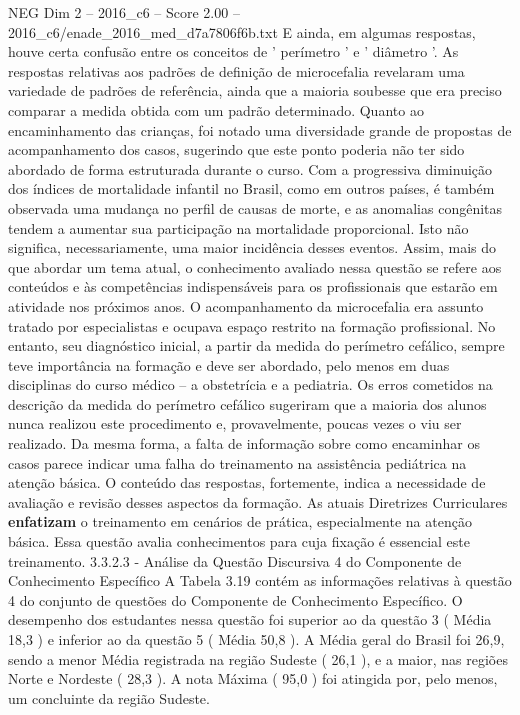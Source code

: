 \begin{textsample}{NEG Dim 2 – 2016\_c6 – Score 2.00 – 2016\_c6/enade\_2016\_med\_d7a7806f6b.txt}
E ainda, em algumas respostas, houve certa confusão entre os conceitos de ' perímetro ' e ' diâmetro '.
As respostas relativas aos padrões de definição de microcefalia revelaram uma variedade de padrões de referência, ainda que a maioria soubesse que era preciso comparar a medida obtida com um padrão determinado.
Quanto ao encaminhamento das crianças, foi notado uma diversidade grande de propostas de acompanhamento dos casos, sugerindo que este ponto poderia não ter sido abordado de forma estruturada durante o curso.
Com a progressiva diminuição dos índices de mortalidade infantil no Brasil, como em outros países, é também observada uma mudança no perfil de causas de morte, e as anomalias congênitas tendem a aumentar sua participação na mortalidade proporcional.
Isto não significa, necessariamente, uma maior incidência desses eventos.
Assim, mais do que abordar um tema atual, o conhecimento avaliado nessa questão se refere aos conteúdos e às competências indispensáveis para os profissionais que estarão em atividade nos próximos anos.
O acompanhamento da microcefalia era assunto tratado por especialistas e ocupava espaço restrito na formação profissional.
No entanto, seu diagnóstico inicial, a partir da medida do perímetro cefálico, sempre teve importância na formação e deve ser abordado, pelo menos em duas disciplinas do curso médico – a obstetrícia e a pediatria.
Os erros cometidos na descrição da medida do perímetro cefálico sugeriram que a maioria dos alunos nunca realizou este procedimento e, provavelmente, poucas vezes o viu ser realizado.
Da mesma forma, a falta de informação sobre como encaminhar os casos parece indicar uma falha do treinamento na assistência pediátrica na atenção básica.
O conteúdo das respostas, fortemente, indica a necessidade de avaliação e revisão desses aspectos da formação.
As atuais Diretrizes Curriculares \textbf{enfatizam} o treinamento em cenários de prática, especialmente na atenção básica.
Essa questão avalia conhecimentos para cuja fixação é essencial este treinamento. 3.3.2.3 - Análise da Questão Discursiva 4 do Componente de Conhecimento Específico A Tabela 3.19 contém as informações relativas à questão 4 do conjunto de questões do Componente de Conhecimento Específico.
O desempenho dos estudantes nessa questão foi superior ao da questão 3 ( Média 18,3 ) e inferior ao da questão 5 ( Média 50,8 ).
A Média geral do Brasil foi 26,9, sendo a menor Média registrada na região Sudeste ( 26,1 ), e a maior, nas regiões Norte e Nordeste ( 28,3 ).
A nota Máxima ( 95,0 ) foi atingida por, pelo menos, um concluinte da região Sudeste.

\end{textsample}
